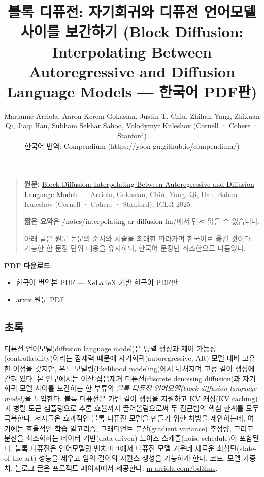 \documentclass[
]{article}
\title{블록 디퓨전: 자기회귀와 디퓨전 언어모델 사이를 보간하기 (Block
Diffusion: Interpolating Between Autoregressive and Diffusion Language
Models --- 한국어 PDF판)}
\author{Marianne Arriola, Aaron Kerem Gokaslan, Justin T. Chiu, Zhihan Yang, Zhixuan Qi, Jiaqi Han, Subham Sekhar Sahoo, Volodymyr Kuleshov (Cornell · Cohere · Stanford)\\한국어 번역: Compendium (https://yoon-gu.github.io/compendium/)}
\date{}
\providecommand{\tightlist}{%
  \setlength{\itemsep}{0pt}\setlength{\parskip}{0pt}}
\begin{document}
\maketitle

{
\setcounter{tocdepth}{3}
\tableofcontents
}
\begin{quote}
\textbf{원문:} \href{https://arxiv.org/abs/2503.09573}{Block Diffusion:
Interpolating Between Autoregressive and Diffusion Language Models} ---
Arriola, Gokaslan, Chiu, Yang, Qi, Han, Sahoo, Kuleshov (Cornell ·
Cohere · Stanford), ICLR 2025

\textbf{짧은 요약}은
\href{/compendium/notes/interpolating-ar-diffusion-lm/}{/notes/interpolating-ar-diffusion-lm/}에서
먼저 읽을 수 있습니다.

아래 글은 원문 논문의 순서와 서술을 최대한 따라가며 한국어로 옮긴
것이다. 가능한 한 문장 단위 대응을 유지하되, 한국어 문장만 최소한으로
다듬었다.
\end{quote}

\textbf{PDF 다운로드}

\begin{itemize}
\tightlist
\item
  \href{/compendium/papers/interpolating-ar-diffusion-lm.pdf}{한국어
  번역본 PDF} --- XeLaTeX 기반 한국어 PDF판
\item
  \href{/compendium/papers/interpolating-ar-diffusion-lm-original.pdf}{arxiv
  원문 PDF}
\end{itemize}

\hypertarget{uxcd08uxb85d}{%
\subsection{초록}\label{uxcd08uxb85d}}

디퓨전 언어모델(diffusion language model)은 병렬 생성과 제어
가능성(controllability)이라는 잠재력 때문에 자기회귀(autoregressive, AR)
모델 대비 고유한 이점을 갖지만, 우도 모델링(likelihood modeling)에서
뒤처지며 고정 길이 생성에 갇혀 있다. 본 연구에서는 이산 잡음제거
디퓨전(discrete denoising diffusion)과 자기회귀 모델 사이를 보간하는 한
부류의 \emph{블록 디퓨전 언어모델(block diffusion language model)}을
도입한다. 블록 디퓨전은 가변 길이 생성을 지원하고 KV 캐싱(KV caching)과
병렬 토큰 샘플링으로 추론 효율까지 끌어올림으로써 두 접근법의 핵심
한계를 모두 극복한다. 저자들은 효과적인 블록 디퓨전 모델을 만들기 위한
처방을 제안하는데, 여기에는 효율적인 학습 알고리즘, 그래디언트
분산(gradient variance) 추정량, 그리고 분산을 최소화하는 데이터
기반(data-driven) 노이즈 스케줄(noise schedule)이 포함된다. 블록
디퓨전은 언어모델링 벤치마크에서 디퓨전 모델 가운데 새로운
최첨단(state-of-the-art) 성능을 세우고 임의 길이의 시퀀스 생성을
가능하게 한다. 코드, 모델 가중치, 블로그 글은 프로젝트 페이지에서
제공한다: \href{https://m-arriola.com/bd3lms}{m-arriola.com/bd3lms}.
\end{document}
